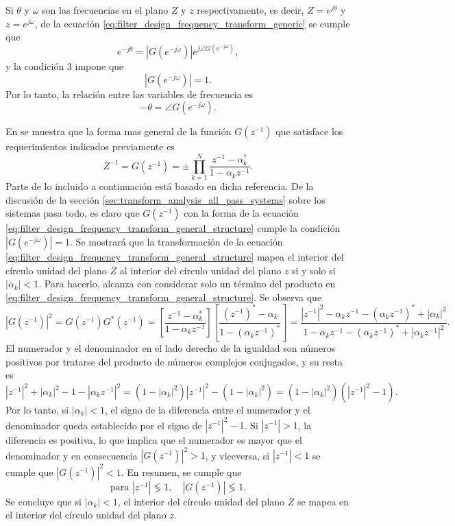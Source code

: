 \documentclass[a4paper]{report}
\begin{document}
Si \(\theta\) y \(\omega\) son las frecuencias en el plano \(Z\) y \(z\) respectivamente, es decir, \(Z=e^{j\theta}\) y \(z=e^{j\omega}\), de la ecuación \ref{eq:filter_design_frequency_transform_generic} se cumple que 
\[
 e^{-j\theta}=|G(e^{-j\omega})|e^{j\angle G(e^{-j\omega})},
\]
y la condición 3 impone que 
\[
 |G(e^{-j\omega})|=1.
\]
Por lo tanto, la relación entre las variables de frecuencia es
\[
 -\theta=\angle G(e^{-j\omega}).
\]

En \cite{constantinides1970spectral} se muestra que la forma mas general de la función \(G(z^{-1})\) que satisface los requerimientos indicados previamente es
\begin{equation}\label{eq:filter_design_frequency_transform_general_structure}
 Z^{-1}=G(z^{-1})=\pm\prod_{k=1}^N\frac{z^{-1}-\alpha_k^*}{1-\alpha_kz^{-1}}. 
\end{equation}
Parte de lo incluido a continuación está basado en dicha referencia. De la discusión de la sección \ref{sec:transform_analysis_all_pass_systems} sobre los sistemas pasa todo, es claro que \(G(z^{-1})\) con la forma de la ecuación \ref{eq:filter_design_frequency_transform_general_structure} cumple la condición \(|G(e^{-j\omega})|=1\). Se mostrará que la transformación de la ecuación \ref{eq:filter_design_frequency_transform_general_structure} mapea el interior del círculo unidad del plano \(Z\) al interior del círculo unidad del plano \(z\) si y solo si \(|\alpha_k|<1\). Para hacerlo, alcanza con considerar solo un término del producto en \ref{eq:filter_design_frequency_transform_general_structure}. Se observa que 
\[
 |G(z^{-1})|^2=G(z^{-1})G^*(z^{-1})
 =\left[\frac{z^{-1}-\alpha_k^*}{1-\alpha_kz^{-1}}\right]\left[\frac{(z^{-1})^*-\alpha_k}{1-(\alpha_kz^{-1})^*}\right]
 =\frac{|z^{-1}|^2-\alpha_kz^{-1}-(\alpha_kz^{-1})^*+|\alpha_k|^2}{1-\alpha_kz^{-1}-(\alpha_kz^{-1})^*+|\alpha_kz^{-1}|^2}.
\]
El numerador y el denominador en el lado derecho de la igualdad son números positivos por tratarse del producto de números complejos conjugados, y su resta es
\[
 |z^{-1}|^2+|\alpha_k|^2-1-|\alpha_kz^{-1}|^2=(1-|\alpha_k|^2)|z^{-1}|^2-(1-|\alpha_k|^2)
 =(1-|\alpha_k|^2)(|z^{-1}|^2-1).
\]
Por lo tanto, si \(|\alpha_k|<1\), el signo de la diferencia entre el numerador y el denominador queda establecido por el signo de \(|z^{-1}|^2-1\). Si \(|z^{-1}|>1\), la diferencia es positiva, lo que implica que el numerador es mayor que el denominador y en consecuencia \(|G(z^{-1})|^2>1\), y viceversa, si \(|z^{-1}|<1\) se cumple que \(|G(z^{-1})|^2<1\). En resumen, se cumple que 
\[
 \textrm{para }|z^{-1}|\lessgtr1,\quad|G(z^{-1})|\lessgtr1. 
\]
Se concluye que si \(|\alpha_k|<1\), el interior del círculo unidad del plano \(Z\) se mapea en el interior del círculo unidad del plano \(z\).
\end{document}
